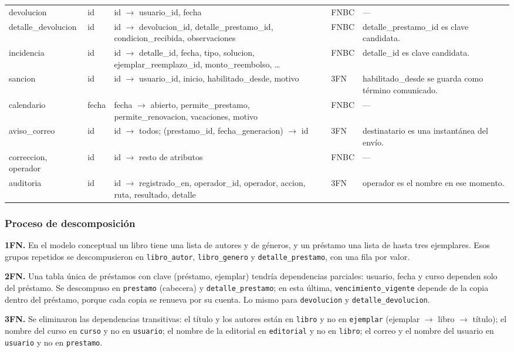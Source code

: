 \documentclass[11pt,a4paper]{article}
\begin{document}
{\begin{longtable}{@{}p{} p{} p{} l p{}@{}}
devolucion & id & id $\to$ usuario\_id, fecha & FNBC & ---\\
detalle\_devolucion & id & id $\to$ devolucion\_id, detalle\_prestamo\_id, condicion\_recibida, observaciones & FNBC & detalle\_prestamo\_id es clave candidata.\\
incidencia & id & id $\to$ detalle\_id, fecha, tipo, solucion, ejemplar\_reemplazo\_id, monto\_reembolso, \ldots & FNBC & detalle\_id es clave candidata.\\
sancion & id & id $\to$ usuario\_id, inicio, habilitado\_desde, motivo & 3FN & habilitado\_desde se guarda como término comunicado.\\
calendario & fecha & fecha $\to$ abierto, permite\_prestamo, permite\_renovacion, vacaciones, motivo & FNBC & ---\\
aviso\_correo & id & id $\to$ todos; (prestamo\_id, fecha\_generacion) $\to$ id & 3FN & destinatario es una instantánea del envío.\\
correccion, operador & id & id $\to$ resto de atributos & FNBC & ---\\
auditoria & id & id $\to$ registrado\_en, operador\_id, operador, accion, ruta, resultado, detalle & 3FN & operador es el nombre en ese momento.\\
\bottomrule
\end{longtable}}

\subsubsection{Proceso de descomposición}
\textbf{1FN.} En el modelo conceptual un libro tiene una lista de autores y de géneros, y un préstamo una lista de hasta tres ejemplares. Esos grupos repetidos se descompusieron en \texttt{libro\_autor}, \texttt{libro\_genero} y \texttt{detalle\_prestamo}, con una fila por valor.

\textbf{2FN.} Una tabla única de préstamos con clave (préstamo, ejemplar) tendría dependencias parciales: usuario, fecha y curso dependen solo del préstamo. Se descompuso en \texttt{prestamo} (cabecera) y \texttt{detalle\_prestamo}; en esta última, \texttt{vencimiento\_vigente} depende de la copia dentro del préstamo, porque cada copia se renueva por su cuenta. Lo mismo para \texttt{devolucion} y \texttt{detalle\_devolucion}.

\textbf{3FN.} Se eliminaron las dependencias transitivas: el título y los autores están en \texttt{libro} y no en \texttt{ejemplar} (ejemplar $\to$ libro $\to$ título); el nombre del curso en \texttt{curso} y no en \texttt{usuario}; el nombre de la editorial en \texttt{editorial} y no en \texttt{libro}; el correo y el nombre del usuario en \texttt{usuario} y no en \texttt{prestamo}.
\end{document}

